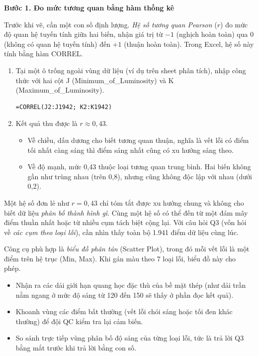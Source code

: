 \documentclass[12pt]{article}
\begin{document}
\noindent
\textbf{Bước 1. Đo mức tương quan bằng hàm thống kê}

\noindent
Trước khi vẽ, cần một con số định lượng. \emph{Hệ số tương quan Pearson} ($r$) đo mức độ quan hệ tuyến tính giữa hai biến, nhận giá trị từ $-1$ (nghịch hoàn toàn) qua 0 (không có quan hệ tuyến tính) đến $+1$ (thuận hoàn toàn). Trong Excel, hệ số này tính bằng hàm CORREL.

\begin{enumerate}
  \item Tại một ô trống ngoài vùng dữ liệu (ví dụ trên sheet phân tích), nhập công thức với hai cột J (Minimum\_of\_Luminosity) và K (Maximum\_of\_Luminosity).
  \begin{aivncodebox}
  \begin{lstlisting}[language=Excel]
=CORREL(J2:J1942; K2:K1942)\end{lstlisting}
  \end{aivncodebox}
  \item Kết quả thu được là $r \approx 0{,}43$.
  \begin{itemize}
    \item Về chiều, dấu dương cho biết tương quan thuận, nghĩa là vết lỗi có điểm tối nhất càng sáng thì điểm sáng nhất cũng có xu hướng sáng theo.
    \item Về độ mạnh, mức 0,43 thuộc loại tương quan trung bình. Hai biến không gần như trùng nhau (trên 0,8), nhưng cũng không độc lập với nhau (dưới 0,2).
  \end{itemize}
\end{enumerate}

\noindent
Một hệ số đơn lẻ như $r = 0{,}43$ chỉ tóm tắt được xu hướng chung và không cho biết dữ liệu \emph{phân bố thành hình gì}. Cùng một hệ số có thể đến từ một đám mây điểm thuần nhất hoặc từ nhiều cụm tách biệt cộng lại. Với câu hỏi Q3 (vốn hỏi về \emph{các cụm theo loại lỗi}), cần nhìn thấy toàn bộ 1.941 điểm dữ liệu cùng lúc.

\noindent
Công cụ phù hợp là \emph{biểu đồ phân tán} (Scatter Plot), trong đó mỗi vết lỗi là một điểm trên hệ trục (Min, Max). Khi gán màu theo 7 loại lỗi, biểu đồ này cho phép.
\begin{itemize}
  \item Nhận ra các dải giới hạn quang học đặc thù của bề mặt thép (như dải trần nằm ngang ở mức độ sáng từ 120 đến 150 sẽ thấy ở phần đọc kết quả).
  \item Khoanh vùng các điểm bất thường (vết lỗi chói sáng hoặc tối đen khác thường) để đội QC kiểm tra lại cảm biến.
  \item So sánh trực tiếp vùng phân bố độ sáng của từng loại lỗi, tức là trả lời Q3 bằng mắt trước khi trả lời bằng con số.
\end{itemize}
\end{document}

